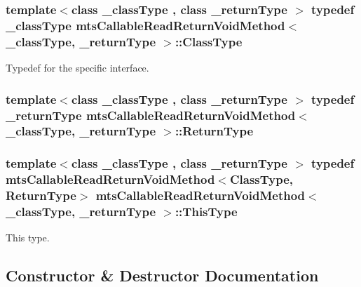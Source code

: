 \subsubsection[{Class\+Type}]{\setlength{\rightskip}{0pt plus 5cm}template$<$class \+\_\+class\+Type , class \+\_\+return\+Type $>$ typedef \+\_\+class\+Type {\bf mts\+Callable\+Read\+Return\+Void\+Method}$<$ \+\_\+class\+Type, \+\_\+return\+Type $>$\+::{\bf Class\+Type}}\label{classmts_callable_read_return_void_method_a694e26a4c7fc28f0c739aa2f2ab97e12}
Typedef for the specific interface. \hypertarget{classmts_callable_read_return_void_method_a7a7034303bbcaa112a28d75dd0a576d2}{}
\subsubsection[{Return\+Type}]{\setlength{\rightskip}{0pt plus 5cm}template$<$class \+\_\+class\+Type , class \+\_\+return\+Type $>$ typedef \+\_\+return\+Type {\bf mts\+Callable\+Read\+Return\+Void\+Method}$<$ \+\_\+class\+Type, \+\_\+return\+Type $>$\+::{\bf Return\+Type}}\label{classmts_callable_read_return_void_method_a7a7034303bbcaa112a28d75dd0a576d2}
\hypertarget{classmts_callable_read_return_void_method_a118254e466e472246199228424a10737}{}
\subsubsection[{This\+Type}]{\setlength{\rightskip}{0pt plus 5cm}template$<$class \+\_\+class\+Type , class \+\_\+return\+Type $>$ typedef {\bf mts\+Callable\+Read\+Return\+Void\+Method}$<${\bf Class\+Type}, {\bf Return\+Type}$>$ {\bf mts\+Callable\+Read\+Return\+Void\+Method}$<$ \+\_\+class\+Type, \+\_\+return\+Type $>$\+::{\bf This\+Type}}\label{classmts_callable_read_return_void_method_a118254e466e472246199228424a10737}
This type. 

\subsection{Constructor \& Destructor Documentation}
\hypertarget{classmts_callable_read_return_void_method_a80d3ca3aaf921033aa3f14dd6a366877}{}
